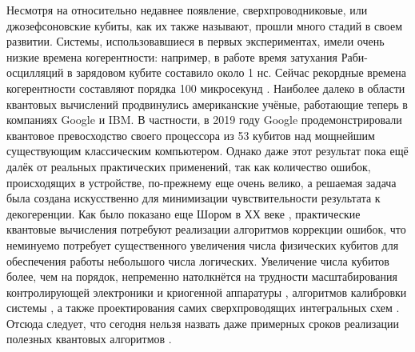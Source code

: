 \documentclass[14pt, a4paper]{extarticle}
\begin{document}
Несмотря на относительно недавнее появление, сверхпроводниковые, или джозефсоновские кубиты, как их также называют, прошли много стадий в своем развитии. Системы, использовавшиеся в первых экспериментах, имели очень низкие времена когерентности: например, в работе \cite{nakamura1999coherent} время затухания Раби-осцилляций в зарядовом кубите составило около 1 нс. Сейчас рекордные времена когерентности составляют порядка 100 микросекунд \cite{kjaergaard2020superconducting}. Наиболее далеко в области квантовых вычислений продвинулись американские учёные, работающие теперь в компаниях Google и IBM. В частности, в 2019 году Google продемонстрировали \cite{arute2019quantum} квантовое превосходство своего процессора из 53 кубитов над мощнейшим существующим классическим компьютером. Однако даже этот результат пока ещё далёк от реальных практических применений, так как количество ошибок, происходящих в устройстве, по-прежнему еще очень велико, а решаемая задача была создана искусственно для минимизации чувствительности результата к декогеренции. Как было показано еще Шором в ХХ веке \cite{shor1995scheme}, практические квантовые вычисления потребуют реализации алгоритмов коррекции ошибок, что неминуемо потребует существенного увеличения числа физических кубитов для обеспечения работы небольшого числа логических. Увеличение числа кубитов более, чем на порядок, непременно натолкнётся на трудности масштабирования контролирующей электроники и криогенной аппаратуры \cite{krinner2019engineering}, алгоритмов калибровки системы \cite{arute2019quantum, kelly2018physical}, а также проектирования самих сверхпроводящих интегральных схем \cite{hutchings2017tunable}. Отсюда следует, что сегодня нельзя назвать даже примерных сроков реализации полезных квантовых алгоритмов \cite{arute2019quantum}.
\end{document}
